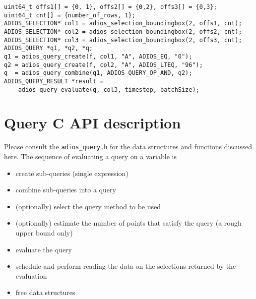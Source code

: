 \begin{lstlisting}[alsolanguage=C,
                             caption={Query over the columns of a table}, label=code:query_columns]
uint64_t offs1[] = {0, 1}, offs2[] = {0,2}, offs3[] = {0,3};
uint64_t cnt[] = {number_of_rows, 1};  
ADIOS_SELECTION* col1 = adios_selection_boundingbox(2, offs1, cnt);
ADIOS_SELECTION* col2 = adios_selection_boundingbox(2, offs2, cnt);
ADIOS_SELECTION* col3 = adios_selection_boundingbox(2, offs3, cnt);
ADIOS_QUERY *q1, *q2, *q;
q1 = adios_query_create(f, col1, "A", ADIOS_EQ, "0");
q2 = adios_query_create(f, col2, "A", ADIOS_LTEQ, "96");
q  = adios_query_combine(q1, ADIOS_QUERY_OP_AND, q2);
ADIOS_QUERY_RESULT *result = 
    adios_query_evaluate(q, col3, timestep, batchSize);

\end{lstlisting}



%
%
\section{Query C API description}

Please consult the \verb+adios_query.h+ for the data structures and functions discussed here.  The sequence of evaluating a query on a variable  is

\begin{itemize}
\renewcommand{\labelitemi}{$-$}
\item create sub-queries (single expression)

\item combine sub-queries into a query

\item (optionally) select the query method to be used

\item (optionally) estimate the number of points that satisfy the query (a rough upper bound only)

\item evaluate the query

\item schedule and perform reading the data on the selections returned by the evaluation

\item free data structures
\end{itemize}

%

